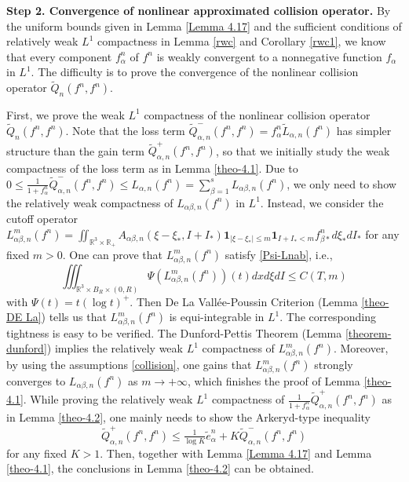 \documentclass[reqno,11pt]{amsart}
\numberwithin{equation}{section}
\def\R{\mathbb{R}}
\begin{document}
{\bf Step 2. Convergence of nonlinear approximated collision operator.} By the uniform bounds given in Lemma \ref{Lemma 4.17} and the sufficient conditions of relatively weak $L^1$ compactness in Lemma \ref{rwc} and Corollary \ref{rwc1}, we know that every component $f^n_\alpha$ of $f^n$ is weakly convergent to a nonnegative function $f_\alpha$ in $L^1$. The difficulty is to prove the convergence of the nonlinear collision operator $\tilde{Q}_n (f^n, f^n)$. 

First, we prove the weak $L^1$ compactness of the nonlinear collision operator $\tilde{Q}_n (f^n, f^n)$. Note that the loss term $\tilde{Q}_{\alpha, n}^- (f^n, f^n) = f^n_\alpha \tilde{L}_{\alpha, n} (f^n)$ has simpler structure than the gain term $\tilde{Q}_{\alpha, n}^+ (f^n, f^n)$, so that we initially study the weak compactness of the loss term as in Lemma \ref{theo-4.1}. Due to $0 \leq \frac{1}{1 + f^n_\alpha} \tilde{Q}^-_{\alpha, n} (f^n, f^n) \leq L_{\alpha, n} (f^n) = \sum_{\beta = 1}^s L_{\alpha \beta, n} (f^n)$, we only need to show the relatively weak compactness of $ L_{\alpha \beta, n} (f^n) $ in $L^1$. Instead, we consider the cutoff operator $ L^m_{\alpha \beta, n} (f^n) = \iint_{\R^3 \times \R_+} A_{\alpha \beta, n} (\xi - \xi_*, I + I_*) \mathbf{1}_{|\xi - \xi_*| \leq m} \mathbf{1}_{I+I_* < m} f^n_{\beta *} d \xi_* d I_* $ for any fixed $m > 0$. One can prove that $ L^m_{\alpha \beta, n} (f^n) $ satisfy \eqref{Psi-Lnab}, i.e.,
\begin{equation*}
  \iiint_{\R^3 \times B_R \times(0,R)} \Psi (L^m_{ \alpha \beta ,n}(f^n)) (t) dxd\xi dI \leq C(T,m) 
\end{equation*}
with $\Psi (t) = t (\log t)^+$. Then De La Vall\'ee-Poussin Criterion (Lemma \ref{theo-DE La}) tells us that $ L^m_{\alpha \beta, n} (f^n) $ is equi-integrable in $L^1$. The corresponding tightness is easy to be verified. The Dunford-Pettis Theorem (Lemma \ref{theorem-dunford}) implies the relatively weak $L^1$ compactness of $L^m_{ \alpha \beta ,n}(f^n)$. Moreover, by using the assumptions \eqref{collision}, one gains that $L^m_{ \alpha \beta ,n}(f^n)$ strongly converges to $L_{ \alpha \beta ,n}(f^n)$ as $m \to + \infty$, which finishes the proof of Lemma \ref{theo-4.1}. While proving the relatively weak $L^1$ compactness of $\frac{1}{1 + f^n_\alpha} \tilde{Q}^+_{\alpha, n} (f^n, f^n)$ as in Lemma \ref{theo-4.2}, one mainly needs to show the Arkeryd-type inequality
\begin{equation*}
  \tilde{Q}^+_{\alpha, n} (f^n, f^n) \leq \tfrac{1}{\log K} \tilde{e}^n_\alpha + K \tilde{Q}^-_{\alpha, n} (f^n, f^n)
\end{equation*}
for any fixed $K > 1$. Then, together with Lemma \ref{Lemma 4.17} and Lemma \ref{theo-4.1}, the conclusions in Lemma \ref{theo-4.2} can be obtained.
\end{document}
